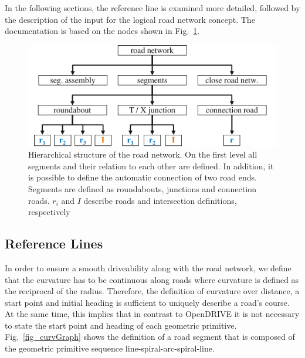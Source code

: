 \documentclass[a4paper, 10pt, conference]{ieeeconf}      %
\begin{document}
In the following sections, the reference line is examined more detailed, followed by the description of the input for the logical road network concept. The documentation is based on the nodes shown in Fig.~\ref{fig_schema}. 
\begin{figure}[thpb] 		
	\centering
	\includegraphics{fig/schema.pdf}
	\caption{Hierarchical structure of the road network. On the first level all segments and their relation to each other are defined. In addition, it is possible to define the automatic connection of two road ends. Segments are defined as roundabouts, junctions and connection roads. $r_i$ and $I$ describe roads and intersection definitions, respectively}
	\label{fig_schema}
\end{figure}
\subsection{Reference Lines} \label{sec_refline} %
In order to ensure a smooth driveability along with the road network, we define that the curvature has to be continuous along roads where curvature is defined as the reciprocal of the radius. Therefore, the definition of curvature over distance, a start point and initial heading is sufficient to uniquely describe a road's course. At the same time, this implies that in contrast to OpenDRIVE it is not necessary to state the start point and heading of each geometric primitive. Fig.~\ref{fig_curvGraph} shows the definition of a road segment that is composed of the geometric primitive sequence line-spiral-arc-spiral-line.
\end{document}
